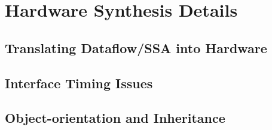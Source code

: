 \documentclass[11pt,notitlepage,twocolumn]{article}
\begin{document}
\section{Hardware Synthesis Details}
\subsection{Translating Dataflow/SSA into Hardware}
\subsection{Interface Timing Issues}
\subsection{Object-orientation and Inheritance}


\end{document}
